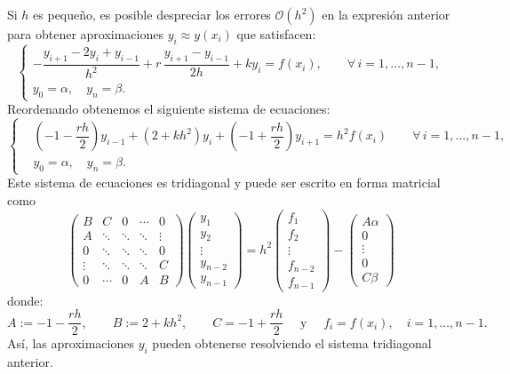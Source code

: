 \documentclass[letterpaper,11pt]{article}
\begin{document}
Si $h$ es peque\~no, es posible despreciar los errores $\mathcal{O}(h^2)$ en la expresi\'on anterior para obtener aproximaciones $y_i\approx y(x_i)$ que satisfacen:
$$
\left\{
\begin{array}{l}
-\dfrac{y_{i+1}-2y_i+y_{i-1}}{h^2}+r\,\dfrac{y_{i+1}-y_{i-1}}{2h}+ky_i=f(x_i), \qquad \forall\,i=1,\ldots,n-1,\\
y_0=\alpha,\quad y_n=\beta.
\end{array}
\right.
$$
Reordenando obtenemos el siguiente sistema de ecuaciones:
$$
\left\{
\begin{aligned}
& \left(-1-\dfrac{rh}{2}\right)y_{i-1}+(2+kh^2)y_i+\left(-1+\dfrac{rh}{2}\right)y_{i+1}=h^2f(x_i) \qquad \forall\,i=1,\ldots,n-1,\\
& y_0=\alpha,\quad y_n=\beta.
\end{aligned}
\right.
$$
Este sistema de ecuaciones es tridiagonal y puede ser escrito en forma matricial como
$$
\begin{pmatrix}
B & C & 0 & \cdots &0\\
A & \ddots & \ddots & \ddots & \vdots\\
0 & \ddots & \ddots & \ddots & 0\\
\vdots & \ddots & \ddots & \ddots & C\\
0 & \cdots & 0 & A & B
\end{pmatrix}
\begin{pmatrix}
y_1\\
y_2\\
\vdots\\
y_{n-2}\\
y_{n-1}
\end{pmatrix}
= h^2
\begin{pmatrix}
f_1\\
f_2\\
\vdots\\
f_{n-2}\\
f_{n-1}
\end{pmatrix}
-
\begin{pmatrix}
A\alpha\\
0\\
\vdots\\
0\\
C\beta
\end{pmatrix}
$$
donde:
$$
A:=-1-\dfrac{rh}{2},\qquad B:=2+kh^2,\qquad C=-1+\dfrac{rh}{2}\quad \text{ y }\quad f_i=f(x_i),\quad i=1,\ldots,n-1.
$$
As\'i, las aproximaciones $y_i$ pueden obtenerse resolviendo el sistema tridiagonal anterior.
\medskip
\end{document}
